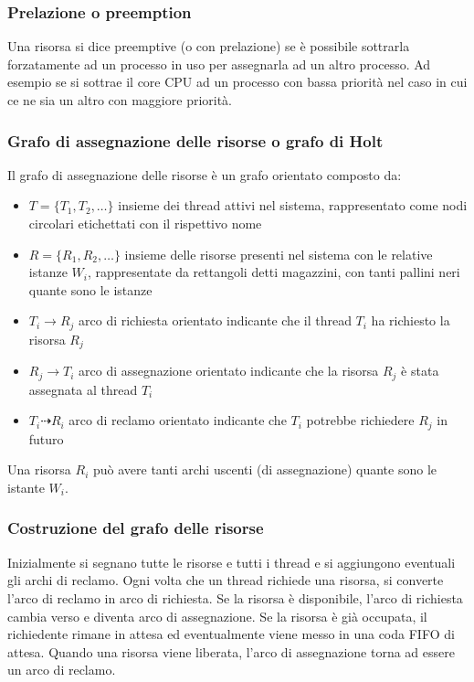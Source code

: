 \documentclass[a4paper]{article}
\begin{document}
\subsubsection*{Prelazione o preemption}
Una risorsa si dice preemptive (o con prelazione) se è possibile sottrarla forzatamente ad un processo in uso per assegnarla ad
un altro processo. Ad esempio se si sottrae il core CPU ad un processo con bassa priorità nel caso in cui ce ne sia un altro con
maggiore priorità.

\subsubsection*{Grafo di assegnazione delle risorse o grafo di Holt}
Il grafo di assegnazione delle risorse è un grafo orientato composto da:
\begin{itemize}
	\item \(T = \{T_1, T_2, \dots\}\) insieme dei thread attivi nel sistema, rappresentato come nodi circolari etichettati con il 
	rispettivo nome
	\item \(R = \{R_1, R_2, \dots\}\) insieme delle risorse presenti nel sistema con le relative istanze \(W_i\), rappresentate da
	rettangoli detti magazzini, con tanti pallini neri quante sono le istanze
	\item \(T_i \to R_j\) arco di richiesta orientato indicante che il thread \(T_i\) ha richiesto la risorsa \(R_j\)
	\item \(R_j \to T_i\) arco di assegnazione orientato indicante che la risorsa \(R_j\) è stata assegnata al thread \(T_i\)
	\item \(T_i \dashrightarrow R_i\) arco di reclamo orientato indicante che \(T_i\) potrebbe richiedere \(R_j\) in futuro
\end{itemize}
Una risorsa \(R_i\) può avere tanti archi uscenti (di assegnazione) quante sono le istante \(W_i\).

\subsubsection*{Costruzione del grafo delle risorse}
Inizialmente si segnano tutte le risorse e tutti i thread e si aggiungono eventuali gli archi di reclamo. Ogni volta che un
thread richiede una risorsa, si converte l'arco di reclamo in arco di richiesta. Se la risorsa è disponibile, l'arco di richiesta
cambia verso e diventa arco di assegnazione. Se la risorsa è già occupata, il richiedente rimane in attesa ed eventualmente viene
messo in una coda FIFO di attesa. Quando una risorsa viene liberata, l'arco di assegnazione torna ad essere un arco di reclamo.
\end{document}
